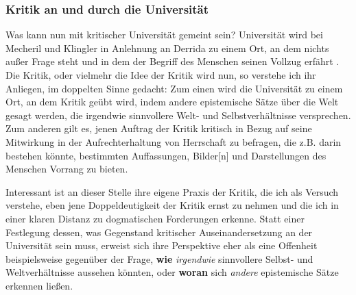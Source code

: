 \subsubsection{Kritik an und durch die Universität}

Was kann nun mit kritischer Universität gemeint sein? Universität wird bei
Mecheril und Klingler in Anlehnung an Derrida \footnotemark
{} zu einem Ort, an dem nichts
außer Frage steht und in dem der \glqq Begriff des Menschen seinen Vollzug
erfährt \grqq \footnotemark {}. Die Kritik, oder vielmehr die Idee der Kritik wird nun, so verstehe
ich ihr Anliegen, im doppelten Sinne gedacht: Zum einen wird die Universität zu
einem Ort, an dem Kritik geübt wird, indem \glqq andere epistemische Sätze
\grqq  \footnotemark {} über
die Welt gesagt werden, die \glqq irgendwie sinnvollere Welt- und
Selbstverhältnisse \grqq \footnotemark {} versprechen. Zum anderen gilt es, jenen Auftrag der Kritik
kritisch in Bezug auf seine Mitwirkung in der Aufrechterhaltung von Herrschaft
zu befragen, die z.B. darin bestehen könnte, bestimmten \glqq Auffassungen,
Bilder[n] und Darstellungen des Menschen \grqq \footnotemark
{} Vorrang zu bieten.

Interessant ist an dieser Stelle ihre eigene Praxis der Kritik, die ich als Versuch verstehe,
eben jene Doppeldeutigkeit der Kritik ernst zu nehmen und die ich in einer
klaren Distanz zu dogmatischen Forderungen erkenne. Statt einer Festlegung
dessen, was Gegenstand kritischer Auseinandersetzung an der Universität sein
muss, erweist sich ihre Perspektive eher als eine Offenheit beispielsweise
gegenüber der Frage, \textbf{wie} \textit{irgendwie} sinnvollere Selbst- und Weltverhältnisse
aussehen könnten, oder \textbf{woran} sich \textit{andere} epistemische Sätze erkennen ließen. 

